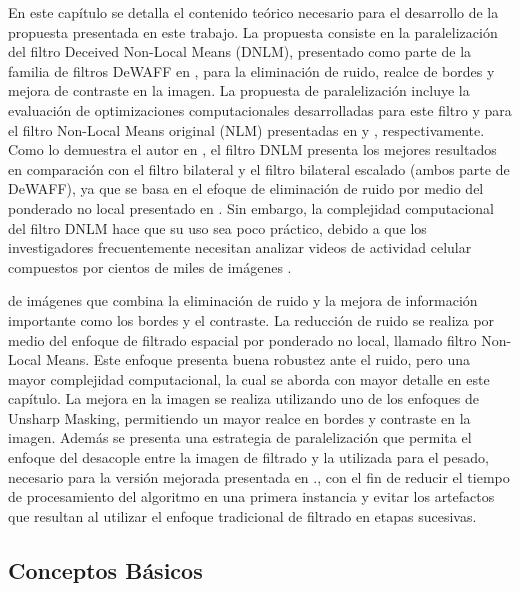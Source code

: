 En este cap\'itulo se detalla el contenido te\'orico necesario para el desarrollo de la propuesta presentada en este trabajo. La propuesta consiste en la paralelizaci\'on del filtro Deceived Non-Local Means (DNLM), presentado como parte de la familia de filtros DeWAFF en \cite{calderon2015dewaff}, para la eliminaci\'on de ruido, realce de bordes y mejora de contraste en la imagen. La propuesta de paralelizaci\'on incluye la evaluaci\'on de optimizaciones computacionales desarrolladas para este filtro y para el filtro Non-Local Means original (NLM) presentadas en \cite{CalderonRamirez2017} y \cite{Condat2010, Darbon2008}, respectivamente.
Como lo demuestra el autor en \cite{calderon2015dewaff}, el filtro DNLM presenta los mejores resultados en comparaci\'on con el filtro bilateral y el filtro bilateral escalado (ambos parte de DeWAFF), ya que se basa en el efoque de eliminaci\'on de ruido por medio del ponderado no local presentado en \cite{buades2005non}. Sin embargo, la complejidad computacional del filtro DNLM hace que su uso sea poco pr\'actico, debido a que los investigadores frecuentemente necesitan analizar videos de actividad celular compuestos por cientos de miles de im\'agenes  \cite{Yang2006NucleiSU, cellsegmentationMarkov, Tay2010, Fils_BfilCells_2008}.





de im\'agenes que combina la eliminaci\'on de ruido y la mejora de informaci\'on importante como los bordes y el contraste. La reducci\'on de ruido se realiza por medio del enfoque de filtrado espacial por ponderado no local, llamado filtro Non-Local Means. Este enfoque presenta buena robustez ante el ruido, pero una mayor complejidad computacional, la cual se aborda con mayor detalle en este cap\'itulo. La mejora en la imagen se realiza utilizando uno de los enfoques de Unsharp Masking, permitiendo un mayor realce en bordes y contraste en la imagen. Adem\'as se presenta una estrategia de paralelizaci\'on que permita el enfoque del desacople entre la imagen de filtrado y la utilizada para el pesado, necesario para la versi\'on mejorada presentada en \cite{deceived}., con el fin de reducir el tiempo de procesamiento del algoritmo en una primera instancia y evitar los artefactos que resultan al utilizar el enfoque tradicional de filtrado en etapas sucesivas. 


\subsection{Conceptos B\'asicos}

